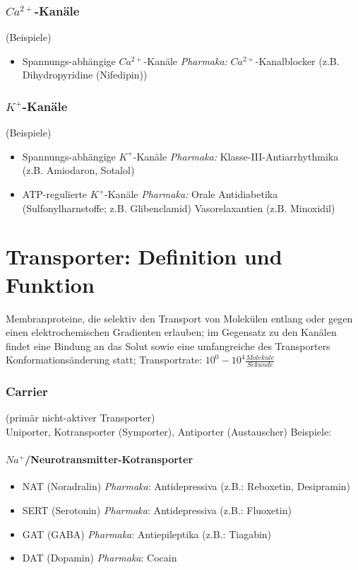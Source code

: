 \documentclass[10pt,a4paper]{report}
\begin{document}
\subsubsection{$Ca^{2+}$-Kanäle} (Beispiele)
\begin{itemize}
	\item Spannungs-abhängige $Ca^{2+}$-Kanäle \textit{Pharmaka:} $Ca^{2+}$-Kanalblocker (z.B. Dihydropyridine (Nifedipin))
\end{itemize}
\subsubsection{$K^+$-Kanäle} (Beispiele)
\begin{itemize}
	\item Spannungs-abhängige $K^+$-Kanäle \textit{Pharmaka:} Klasse-III-Antiarrhythmika (z.B. Amiodaron, Sotalol)
	\item ATP-regulierte  $K^+$-Kanäle \textit{Pharmaka:} 	Orale Antidiabetika (Sulfonylharnstoffe; z.B. Glibenclamid)
Vasorelaxantien (z.B. Minoxidil)
\end{itemize}
\section{Transporter: Definition und Funktion}
Membranproteine, die selektiv den Transport von Molekülen entlang oder gegen einen elektrochemischen Gradienten erlauben; im Gegensatz zu den Kanälen findet eine Bindung an das Solut sowie eine umfangreiche  des Transporters Konformationsänderung statt; Transportrate: $10^0-10^4 \frac{Molek\ddot{u}le}{Sekunde}$
\subsubsection{Carrier} (primär nicht-aktiver Transporter) \\
	Uniporter, Kotransporter (Symporter), Antiporter (Austauscher)
	Beispiele:
\paragraph{$Na^+$/Neurotransmitter-Kotransporter}
\begin{itemize}
	\item NAT (Noradralin)	\textit{Pharmaka}: Antidepressiva (z.B.: Reboxetin, Desipramin)
	\item SERT (Serotonin)	\textit{Pharmaka}: Antidepressiva (z.B.: Fluoxetin) 
	\item GAT (GABA)	\textit{Pharmaka}: Antiepileptika (z.B.: Tiagabin)
	\item DAT (Dopamin)	\textit{Pharmaka}: Cocain
\end{itemize} 
\end{document}

